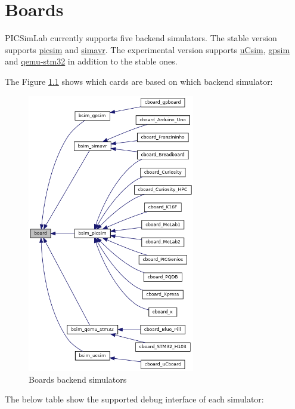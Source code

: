 

\chapter{Boards}\hypertarget{def:boards}{}

PICSimLab currently supports five backend simulators. The stable version supports 
\href{https://github.com/lcgamboa/picsim}{picsim} and \href{https://github.com/buserror/simavr}{simavr}. 
The experimental version supports \href{http://mazsola.iit.uni-miskolc.hu/\%7edrdani/embedded/ucsim/}{uCsim}, 
\href{http://gpsim.sourceforge.net/}{gpsim} and \href{http://beckus.github.io/qemu_stm32/}{qemu-stm32} in 
addition to the stable ones.

The Figure \ref{bback}  shows which cards are based on which backend simulator:

\begin{figure}[H]
\center
\includegraphics[width=0.65\textwidth]{img/boards.png} 

\caption{Boards backend simulators \label{bback}}
\end{figure} 

The below table show the supported debug interface of each simulator:

